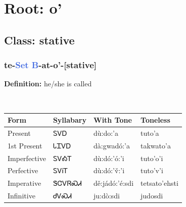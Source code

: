 \needspace{4in}
\section*{Root: o'}
\nopagebreak
{}
\needspace{3in}
\subsection*{Class: stative}
\nopagebreak
\needspace{2in}
\subsubsection*{te{-}\textcolor{RoyalBlue}{Set B}{-}at{-}\textbf{o'}{-}[stative]}
\nopagebreak
\textbf{Definition: } he/she is called
\\[0.5em]
\begin{tabularx}{\textwidth}{l X X X}%
\toprule%
\textbf{Form}&\textbf{Syllabary}&\textbf{With Tone}&\textbf{Toneless}\\%
\midrule%
Present&ᏚᏙᎠ&dù:do:’a&tuto'a\\%
1st Present&ᏓᏆᏙᎠ&dà:gwadó:’a&takwato'a\\%
Imperfective&ᏚᏙᎣᎢ&dù:dó:’ó:’i&tuto'o'i\\%
Perfective&ᏚᏙᎥᎢ&dù:dó:’v̌:’i&tuto'v'i\\%
Imperative&ᏕᏣᏙᏒᏍᏗ&dě:jádó:’é:sdi&tetsato'ehsti\\%
Infinitive&ᏧᏙᏍᏗ&ju:dò:sdi&judosdi\\%
\bottomrule%
\end{tabularx}
\\[1em]